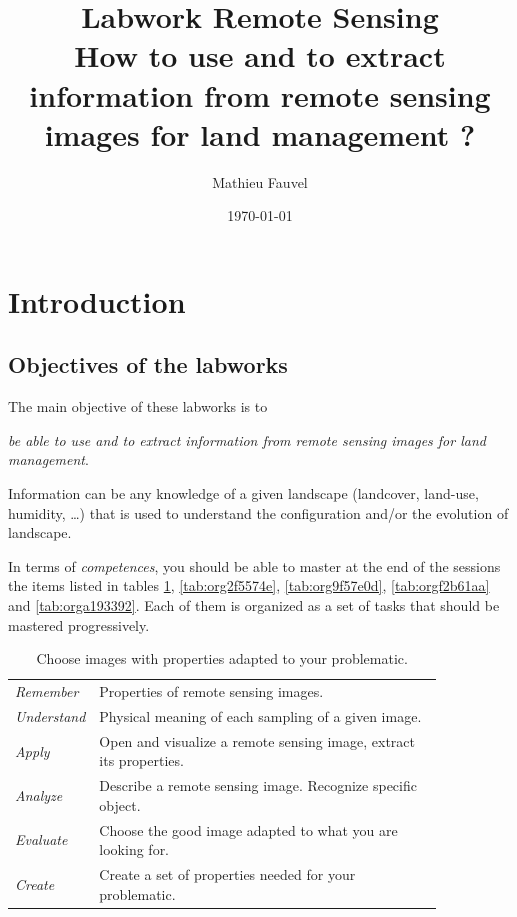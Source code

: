 \documentclass[a4paper,11pt,DIV=18]{scrartcl}
\author{Mathieu Fauvel}
\date{\today}
\title{Labwork Remote Sensing\\\medskip
\large How to use and to extract information from remote sensing images for land management ?}
\begin{document}
\maketitle
\setcounter{tocdepth}{2}
\tableofcontents

\section{Introduction}
\label{sec:org56b27a4}
\subsection{Objectives of the labworks}
\label{sec:orgdfcf6d3}
The main objective of these labworks is to
\begin{center}
\emph{be able to  use and to extract information from  remote sensing images
for land management}.
\end{center}
Information  can be  any knowledge  of a  given landscape  (landcover,
land-use, humidity, \ldots{})  that is used to understand the configuration
and/or the evolution of landscape.

In terms of  \emph{competences}, you should be  able to master at  the end of
the sessions  the items listed in  tables \ref{tab:org6c0f116}, \ref{tab:org2f5574e}, \ref{tab:org9f57e0d},  \ref{tab:orgf2b61aa} and \ref{tab:orga193392}.
Each of them  is organized as a  set of tasks that  should be mastered
progressively.

\begin{table}[htbp]
\caption{\label{tab:org6c0f116}
Choose images with properties adapted to your problematic.}
\centering
\begin{tabular}{lp{0.85\linewidth}}
\toprule
\emph{Remember} & Properties of remote sensing images.\\
\emph{Understand} & Physical meaning of each sampling of a given image.\\
\emph{Apply} & Open and visualize a remote sensing image, extract its properties.\\
\emph{Analyze} & Describe a remote sensing image. Recognize specific object.\\
\emph{Evaluate} & Choose the good image adapted to what you are looking for.\\
\emph{Create} & Create a set of properties needed for your problematic.\\
\bottomrule
\end{tabular}
\end{table}
\end{document}
